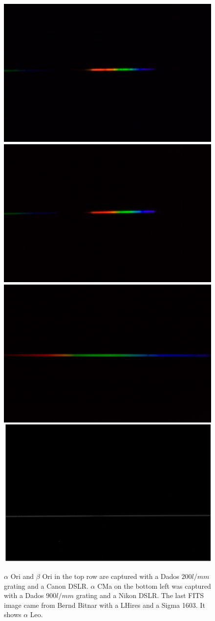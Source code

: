 \documentclass[10pt,a4paper,notitlepage]{article}
\begin{document}
	\begin{figure}[h]
		\includegraphics[width=0.49\columnwidth]{img/alpori.png}
		\includegraphics[width=0.49\columnwidth]{img/betori.png} \\
		\includegraphics[width=0.49\columnwidth]{img/alpcma.png}
		\includegraphics[width=0.49\columnwidth]{img/alpleo.png}
		
		\caption[orig]%
		{$\alpha$ Ori and $\beta$ Ori in the top row are captured with a Dados $200 l/mm$ grating and a Canon DSLR.
		$\alpha$ CMa on the bottom left was captured with a Dados $900 l/mm$ grating and a Nikon DSLR.
		The last FITS image came from Bernd Bitnar with a LHires and a Sigma 1603. It shows $\alpha$ Leo.}
		\label{fig:orig}
	\end{figure}
	
\end{document}
